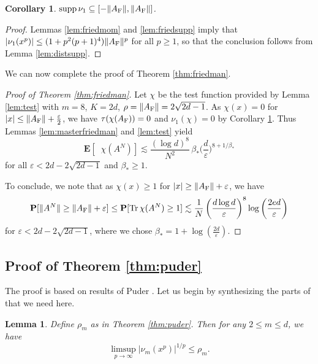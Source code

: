 \documentclass[10pt,reqno]{amsart}
\newtheorem{lem}[thm]{Lemma}
\newtheorem{cor}[thm]{Corollary}
\theoremstyle{definition}
\theoremstyle{remark}
\numberwithin{equation}{section}
\numberwithin{figure}{section}
\numberwithin{table}{section}
\newcommand{\supp}{\mathop{\mathrm{supp}}}
\newcommand{\tr}{\mathop{\mathrm{Tr}}}
\newcommand{\ntrN}{\mathop{\mathrm{tr}_N}}
\newcommand{\EE}{\mathbf{E}}
\begin{document}

\begin{cor}
\label{cor:friedsupp}
$\supp\nu_1 \subseteq [-\|A_{\rm F}\|,\|A_{\rm F}\|]$.
\end{cor}

\begin{proof}
Lemmas \ref{lem:friedmom} and \ref{lem:friedsupp} imply that
$|\nu_1(x^p)| \le (1+p^2(p+1)^4)\|A_{\rm F}\|^p$ for all $p\ge 1$,
so that the conclusion follows from Lemma \ref{lem:distsupp}.
\end{proof}

We can now complete the proof of Theorem \ref{thm:friedman}.

\begin{proof}[Proof of Theorem \ref{thm:friedman}]
Let $\chi$ be the test function provided by Lemma \ref{lem:test} with 
$m=8$, $K=2d$, $\rho=\|A_{\rm F}\|=2\sqrt{2d-1}$. As $\chi(x)=0$ for 
$|x|\le \|A_{\rm F}\|+\frac{\varepsilon}{2}$, we have $\tau(\chi(A_{\rm 
F}))=0$ and $\nu_1(\chi)=0$ by Corollary \ref{cor:friedsupp}.
Thus Lemmas \ref{lem:masterfriedman} and \ref{lem:test} yield
$$
	\EE[\ntrN \chi(A^N)] 
	\lesssim 
	\frac{(\log d)^8}{N^2}\, \beta_* 
	\bigg(\frac{d}{\varepsilon}\bigg)^{8+1/\beta_*}
$$
for all $\varepsilon < 2d-2\sqrt{2d-1}$ and $\beta_*\ge 1$.

To conclude, we note that as 
$\chi(x)\ge 1$ for $|x|\ge \|A_{\rm F}\|+\varepsilon$, we have
$$
	\mathbf{P}[\|A^N\|\ge\|A_{\rm F}\|+\varepsilon]
	\le
	\mathbf{P}[\tr \chi(A^N) \ge 1]
	\lesssim
	\frac{1}{N}\, 
	\bigg(\frac{d\log d}{\varepsilon}\bigg)^{8}
	\log\bigg(\frac{2ed}{\varepsilon}\bigg)
$$
for $\varepsilon < 2d-2\sqrt{2d-1}$, where we chose
$\beta_*=1+\log(\frac{2d}{\varepsilon})$.
\end{proof}


\subsection{Proof of Theorem \ref{thm:puder}}
\label{sec:puder}

The proof is based on results of Puder \cite{Pud15}. Let 
us begin by synthesizing the parts of \cite{Pud15} that we need here.

\begin{lem}
\label{lem:puder}
Define $\rho_m$ as in Theorem \ref{thm:puder}. Then
for any $2\le m\le d$, we have
$$
	\limsup_{p\to\infty}|\nu_m(x^p)|^{1/p} \le
	\rho_m.
$$
\end{lem}
\end{document}
